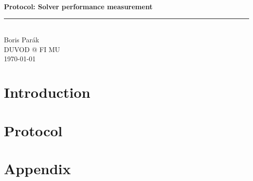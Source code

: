 \documentclass[a4paper,12pt]{article}
\makeatletter
\newcommand{\protocol}{Solver performance measurement}
\newcommand{\labtitle}{DUVOD @ FI MU}
\newcommand{\authorname}{Boris Parák}
\makeatother
\begin{document}
\begin{titlepage}
\begin{center}
{\LARGE \textbf{Protocol: \protocol} \\ \vspace{4pt}}
\rule[13pt]{\textwidth}{1pt} \\ \vspace{150pt}
{\large \authorname \\ \vspace{10pt}
{\large \textsc{\labtitle} \\ \vspace{10pt}}
\today}
\end{center}
\end{titlepage}

\newpage
\thispagestyle{empty}
\tableofcontents
\clearpage

\setcounter{page}{1}

\section{Introduction}

\pagebreak

\section{Protocol}

\pagebreak

\section{Appendix}
\end{document}
